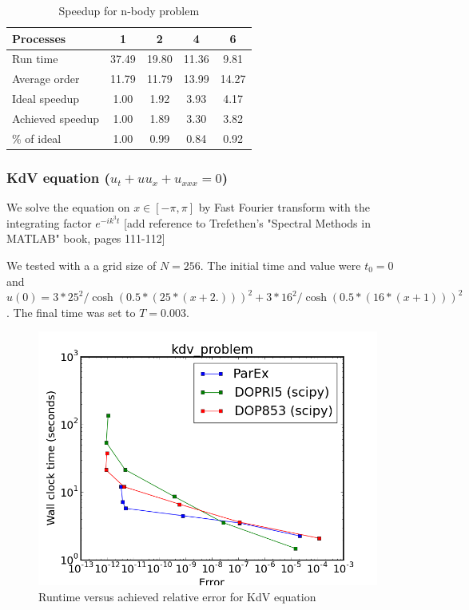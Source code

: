 \documentclass[12pt]{article}
\begin{document}
\begin{table}
\caption{Speedup for n-body problem\label{tbl:nbody}}{
\begin{tabular}{lcccc}\\
Processes & 1 & 2 & 4 & 6\\ \hline
Run time & 37.49 & 19.80 & 11.36 &  9.81 \\
Average order & 11.79 & 11.79 & 13.99 & 14.27 \\
Ideal speedup &  1.00 &  1.92 &  3.93 &  4.17 \\
Achieved speedup &  1.00 &  1.89 &  3.30 &  3.82 \\
\% of ideal &  1.00 &  0.99 &  0.84 &  0.92 \\ \hline
\end{tabular}}
\end{table}


\subsubsection{KdV equation ($u_t+uu_x+u_{xxx}=0$)}
We solve the equation on $x \in [-\pi,\pi]$  by Fast Fourier transform with the integrating factor $e^{-ik^3t}$ [add reference to Trefethen's "Spectral Methods in MATLAB" book, pages 111-112]

We tested with a a grid size of $N=256$. The initial time and value were $t_0=0$ and $u(0) = 3*25^2/\cosh(0.5*(25*(x+2.)))^2 + 3*16^2/\cosh(0.5*(16*(x+1)))^2 $. The final time was set to $T = 0.003$.
\begin{figure}[h]
 \includegraphics[scale=0.5]{images/kdv_problem_err_vs_time.png}
\centering
\caption{Runtime versus achieved relative error for KdV equation}
\end{figure}
\end{document}
